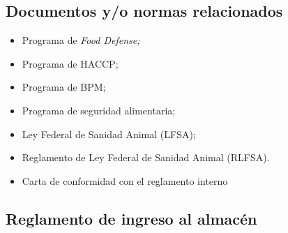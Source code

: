 \subsection{Documentos y/o normas relacionados}
\begin{itemize}
	\item Programa de \textit{Food Defense;}
	\item Programa de \gls{HACCP};
	\item Programa de BPM;
	\item Programa de seguridad alimentaria;
	\item Ley Federal de Sanidad Animal (LFSA);
	\item Reglamento de Ley Federal de Sanidad Animal (RLFSA).
	\item Carta de conformidad con el reglamento interno
\end{itemize}

\subsection{Reglamento de ingreso al almacén}

